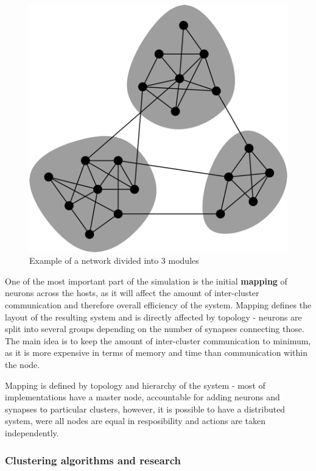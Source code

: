 \begin{figure}[h]
\begin{center}
\includegraphics[scale = 0.3]{images/modular_division.png}
\end{center}
\caption{Example of a network divided into 3 modules\cite{Newman2006}}
\end{figure}

One of the most important part of the simulation is the initial \textbf{mapping} of neurons across the hosts, as it will affect the amount of inter-cluster communication and therefore overall efficiency of the system. Mapping defines the layout of the resulting system and is directly affected by topology - neurons are split into several groups depending on the number of synapses connecting those. The main idea is to keep the amount of inter-cluster communication to minimum, as it is more expensive in terms of memory and time than communication within the node.

Mapping is defined by topology and hierarchy of the system - most of implementations have a master node, accountable for adding neurons and synapses to particular clusters, however, it is
possible to have a distributed system, were all nodes are equal in resposibility and actions are taken independently.

\subsubsection{Clustering algorithms and research}

